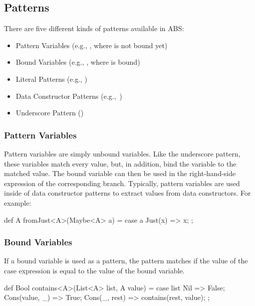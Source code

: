 
\subsection{Patterns}
There are five different kinds of patterns available in ABS:
\begin{itemize}
\item Pattern Variables (e.g., , where  is not bound yet)
\item Bound Variables (e.g., , where  is bound)
\item Literal Patterns (e.g., )
\item Data Constructor Patterns (e.g.,~)
\item Underscore Pattern (\absinline{_})
\end{itemize}

\subsubsection{Pattern Variables}
Pattern variables are simply unbound variables.
Like the underscore pattern, these variables match every value, but, in addition, bind the variable to the matched value. The bound variable can then be used in the right-hand-side expression of the corresponding branch.
Typically, pattern variables are used inside of data constructor patterns to extract values from data constructors.
For example:
\begin{abscode}
def A fromJust<A>(Maybe<A> a) = 
  case a { 
    Just(x) => x; 
  };
\end{abscode}

\subsubsection{Bound Variables}
If a bound variable is used as a pattern, the pattern matches if the value of the case expression is equal to the value of the bound variable.

\begin{abscode}
def Bool contains<A>(List<A> list, A value) =
  case list {
    Nil => False;
    Cons(value, _) => True;
    Cons(_, rest) => contains(rest, value);
  };
\end{abscode}

